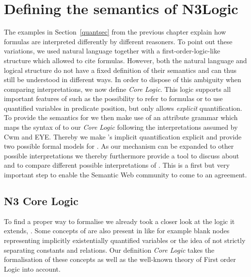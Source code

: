 
\chapter{Defining the semantics of N3Logic}\label{semofn3}
The examples in Section~\ref{quantsec} from the previous chapter explain how \nthree formulas are interpreted differently by different reasoners. To point out these variations,
we used natural language together with a
first-order-logic-like structure which allowed to cite formulas. 
However, both the natural language and logical structure do not have a fixed definition of their semantics
and can 
thus still be understood in different 
ways. In order to dispose of this ambiguity when comparing interpretations, 
 we  now define \emph{\nthree Core Logic}. 
This logic  supports all important features of \nthree such as the possibility to refer to formulas or to use quantified variables in predicate position, 
but only allows \emph{explicit} quantification. 
To provide the semantics for \nthreelogic we then make use of an attribute grammar  which maps the syntax of \nthree to our  \emph{\nthree Core Logic} following the interpretations 
assumed by Cwm and EYE.
Thereby we make \nthree's implicit quantification explicit and provide 
two possible formal models for \nthree. 
As our mechanism can be expanded to other possible interpretations we thereby furthermore provide a tool to discuss about and to compare different possible interpretations
of \nthreelogic. This is a first but very important step to enable the Semantic Web community to come to an agreement.

\section{N3 Core Logic}\label{core}
To find a proper way to formalise \nthreelogic  we already took a closer look at the logic it extends, \rdf. 
Some concepts of \nthree are also present in \rdf like for example blank nodes representing implicitly existentially quantified variables or the idea of not strictly separating 
constants and 
relations. Our definition \emph{\nthree Core Logic} %
takes the formalisation of these concepts as well as the well-known theory of First order Logic into account. 

